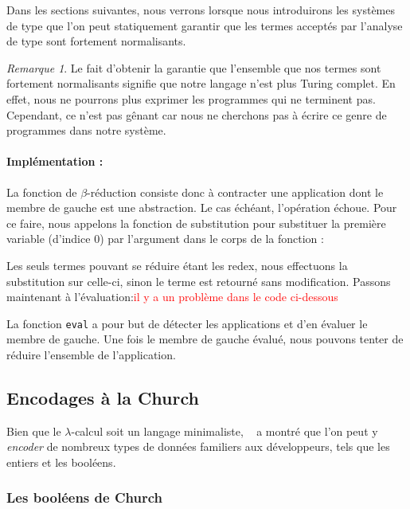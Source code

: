 \documentclass {article}
\newcommand{\codefrom}[3]
           {}
\theoremstyle{definition}
\theoremstyle{remark}
\newtheorem{remark}{Remarque}
\newcommand{\todo}[1]{\textcolor{red}{#1}}
\newcommand{\fun}[1]{\lstinline!#1!}
\begin{document}
Dans les sections suivantes, nous verrons lorsque nous introduirons
les systèmes de type que l'on peut statiquement garantir que les
termes acceptés par l'analyse de type sont fortement normalisants.

\begin{remark}
  Le fait d'obtenir la garantie que l'ensemble que nos termes sont fortement normalisants signifie que
  notre langage n'est plus Turing complet. En effet, nous ne pourrons plus exprimer les programmes
  qui ne terminent pas. Cependant, ce n'est pas gênant car nous ne cherchons pas à écrire ce genre de
  programmes dans notre système.
\end{remark}




\paragraph{Implémentation :}
La fonction de $\beta$-réduction consiste donc à contracter une
application dont le membre de gauche est une abstraction. Le cas
échéant, l'opération échoue. Pour ce faire, nous appelons la fonction
de substitution pour substituer la première variable (d'indice \(0\))
par l'argument dans le corps de la fonction : 
%
\codefrom{untyped}{lambda}{reduction}

Les seuls termes pouvant se réduire étant les redex, nous effectuons la substitution sur celle-ci,
sinon le terme est retourné sans modification.
Passons maintenant à l'évaluation:\todo{il y a un problème dans le code ci-dessous}

\codefrom{untyped}{lambda}{evaluation}
\codefrom{untyped}{lambda}{evaluation_bis}

La fonction \fun{eval} a pour but de détecter les applications et d'en évaluer le membre de gauche.
Une fois le membre de gauche évalué, nous pouvons tenter de réduire l'ensemble de l'application.

\subsection{Encodages à la Church}

Bien que le $\lambda$-calcul soit un langage minimaliste, ~\citet{church:lambda-calcul} a montré que l'on peut
y \emph{encoder} de nombreux types de données familiers aux développeurs, tels que
les entiers et les booléens.


\subsubsection{Les booléens de Church}
\label{church-bool}
\end{document}
